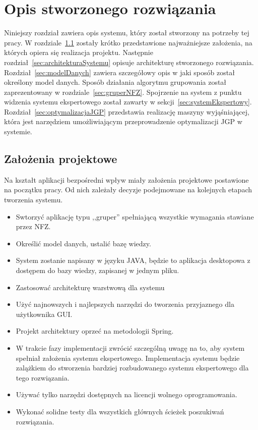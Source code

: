 \chapter{Opis stworzonego rozwiązania}
\label{cha:rozwiazanie}

Niniejszy rozdział zawiera opis systemu, który został stworzony na potrzeby tej pracy. W rozdziale~\ref{sec:zalozeniaProjektowe} zostały krótko przedstawione najważniejsze założenia, na których opiera się realizacja projektu. Następnie rozdział~\ref{sec:architekturaSystemu} opisuje architekturę stworzonego rozwiązania. Rozdział~\ref{sec:modelDanych} zawiera szczegółowy opis w jaki sposób został określony model danych. Sposób działania algorytmu grupowania został zaprezentowany w rozdziale~\ref{sec:gruperNFZ}. Spojrzenie na system z punktu widzenia systemu ekspertowego został zawarty w sekcji~\ref{sec:systemEkspertowy}. Rozdział~\ref{sec:optymalizacjaJGP} przedstawia realizację maszyny wyjąśniającej, która jest narzędziem umożliwiającym przeprowadzenie optymalizacji JGP w systemie.

\section{Założenia projektowe}
\label{sec:zalozeniaProjektowe}

Na kształt aplikacji bezpośredni wpływ miały założenia projektowe postawione na początku pracy. Od nich zależały decyzje podejmowane na kolejnych etapach tworzenia systemu.

\begin{itemize}
 \item Swtorzyć aplikację typu ,,gruper'' spełniającą wszystkie wymagania stawiane przez NFZ.
 \item Określić model danych, ustalić bazę wiedzy.
 \item System zostanie napisany w języku JAVA, będzie to aplikacja desktopowa z dostępem do bazy wiedzy, zapisanej w jednym pliku.
 \item Zastosować architekturę warstwową dla systemu
 \item Użyć najnowszych i najlepszych narzędzi do tworzenia przyjaznego dla użytkownika GUI.
 \item Projekt architektury oprzeć na metodologii Spring.
 \item W trakcie fazy implementacji zwrócić szczególną uwagę na to, aby system spełniał założenia systemu ekspertowego. Implementacja systemu będzie zalążkiem do stworzenia bardziej rozbudowanego systemu ekspertowego dla tego rozwiązania.
 \item Używać tylko narzędzi dostępnych na licencji wolnego oprogramowania.
 \item Wykonać solidne testy dla wszystkich głównych ścieżek poszukiwań rozwiązania.
\end{itemize}

